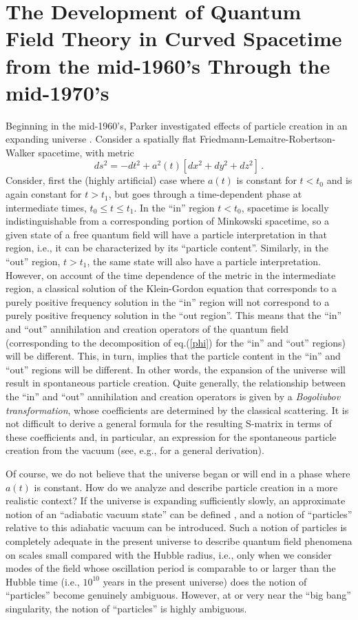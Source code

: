 \documentclass[12pt,epsf,amsfonts,amssymb]{article}
\begin{document}
\section{The Development of Quantum Field Theory in Curved Spacetime 
from the mid-1960's Through the mid-1970's}

Beginning in the mid-1960's, Parker investigated effects of
particle creation in an expanding universe \cite{p1,p2}. Consider a
spatially flat Friedmann-Lemaitre-Robertson-Walker spacetime, with metric
\begin{equation}
ds^2 = - dt^2 + a^2(t) [dx^2 + dy^2 + dz^2] \, .
\end{equation}
Consider, first the (highly artificial) case where $a(t)$ is constant
for $t<t_0$ and is again constant for $t>t_1$, but goes through a
time-dependent phase at intermediate times, $t_0 \leq t \leq t_1$. In
the ``in'' region $t<t_0$, spacetime is locally indistinguishable from
a corresponding portion of Minkowski spacetime, so a given state of a
free quantum field will have a particle interpretation in that region,
i.e., it can be characterized by its ``particle content''. Similarly,
in the ``out'' region, $t>t_1$, the same state will also have a
particle interpretation. However, on account of the time dependence of
the metric in the intermediate region, a classical solution of the
Klein-Gordon equation that corresponds to a purely positive frequency
solution in the ``in'' region will not correspond to a purely positive
frequency solution in the ``out region''. This means that the ``in''
and ``out'' annihilation and creation operators of the quantum field
(corresponding to the decomposition of eq.(\ref{phi}) for the ``in''
and ``out'' regions) will be different. This, in turn, implies that
the particle content in the ``in'' and ``out'' regions will be
different. In other words, the expansion of the universe will result
in spontaneous particle creation.  Quite generally, the relationship
between the ``in'' and ``out'' annihilation and creation operators is
given by a {\it Bogoliubov transformation}, whose coefficients are
determined by the classical scattering. It is not difficult to derive
a general formula for the resulting S-matrix in terms of these
coefficients and, in particular, an expression for the spontaneous
particle creation from the vacuum (see, e.g., \cite{w2} for a general
derivation).

Of course, we do not believe that the universe began or will end in a
phase where $a(t)$ is constant. How do we analyze and describe
particle creation in a more realistic context? If the universe is
expanding sufficiently slowly, an approximate notion of an ``adiabatic
vacuum state'' can be defined \cite{p2}, and a notion of ``particles''
relative to this adiabatic vacuum can be introduced. Such a notion of
particles is completely adequate in the present universe to describe
quantum field phenomena on scales small compared with the Hubble
radius, i.e., only when we consider modes of the field whose
oscillation period is comparable to or larger than the Hubble time
(i.e., $10^{10}$ years in the present universe) does the notion of
``particles'' become genuinely ambiguous.  However, at or very near
the ``big bang'' singularity, the notion of ``particles'' is highly
ambiguous.
\end{document}
